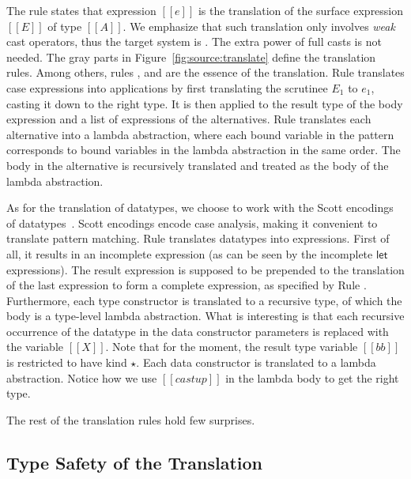 The rule states that \ecore expression $[[e]]$ is the translation of
the surface expression $[[E]]$ of type $[[A]]$. We emphasize that such
translation only involves \emph{weak} cast operators, thus the target
system is \ecore. The extra power of full casts is not needed.
The gray parts in
Figure~\ref{fig:source:translate} define the translation
rules. Among others, rules ,  and
 are the essence of the translation. Rule
 translates case expressions into applications by
first translating the scrutinee $E_1$ to $e_1$, casting it down to the
right type. It is then applied to the result type of the body
expression and a list of \ecore expressions of the alternatives. Rule
 translates each alternative into a lambda
abstraction, where each bound variable in the pattern corresponds to
bound variables in the lambda abstraction in the same order. The body
in the alternative is recursively translated and treated as the body
of the lambda abstraction. %

As for the translation of datatypes, we choose to work with the Scott
encodings of datatypes~. Scott encodings encode
case analysis, making it convenient to translate pattern
matching. Rule  translates datatypes into \ecore
expressions. First of all, it results in an incomplete expression (as
can be seen by the incomplete $\mathsf{let}$ expressions). The result
expression is supposed to be prepended to the translation of the last
expression to form a complete \ecore expression, as specified by Rule
. Furthermore, each type constructor is translated
to a recursive type, of which the body is a type-level lambda
abstraction. What is interesting is that each recursive occurrence of
the datatype in the data constructor parameters is replaced with the
variable $[[X]]$. Note that for the moment, the result type variable
$[[bb]]$ is restricted to have kind $\star$.%
Each data constructor is translated to a lambda
abstraction. Notice how we use $[[castup]]$ in the lambda body to get
the right type.

The rest of the translation rules hold few surprises.

\subsection{Type Safety of the Translation}

